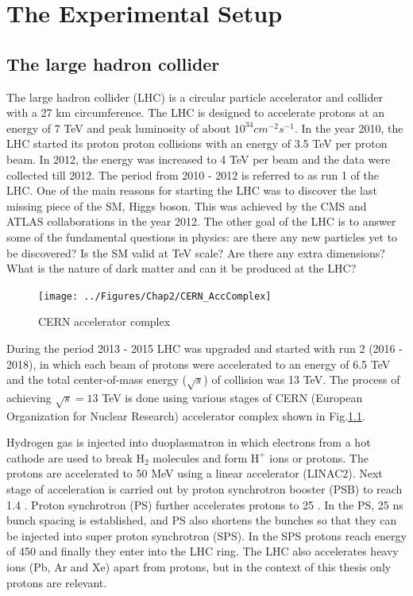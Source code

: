 \chapter{The Experimental Setup}
\label{Chap2}

\section{The large hadron collider}
The large hadron collider (LHC) is a circular particle accelerator and collider with a 27 km circumference. The LHC is designed to 
accelerate protons at an energy of 7 TeV \cite{Bruning:782076} and peak luminosity of about $10^{34}cm^{-2}s^{-1}$.
In the year 2010, the LHC started its proton proton collisions with an energy of 3.5 TeV per proton beam. In 2012, the energy was increased to 4 TeV per beam and the data were collected till 2012. The period from 2010 - 2012 is referred to as run 1 of the LHC.
One of the main reasons for starting the LHC was to discover the last missing piece of the SM, Higgs boson. This was
achieved by the CMS and ATLAS collaborations \cite{Aad:2012tfa}\cite{Chatrchyan:2012xdj} in the year 2012. The other goal of
the LHC is to answer some of the fundamental questions in physics: are there any new particles yet to be discovered?
Is the SM valid at TeV scale? Are there any extra dimensions? What is the nature of dark matter and can it be produced at the LHC?
\begin{figure}[h!]
\centering
\texttt{[image: ../Figures/Chap2/CERN\_AccComplex]}
\caption[CERN accelerator complex]{CERN accelerator complex}
\label{fig:CERN_AccComplex}
\end{figure}
During the period 2013 - 2015 LHC was upgraded and started with run 2 (2016 - 2018), in which each beam of protons were accelerated to 
an energy of 6.5 TeV and the total center-of-mass energy ($\sqrt{s}$) of collision was 13 TeV. The process of achieving $\sqrt{s} = 13$ 
TeV is done using various stages of CERN (European Organization for Nuclear Research) accelerator complex \cite{Haffner:1621894} shown in 
Fig.\ref{fig:CERN_AccComplex}.

Hydrogen gas is injected into duoplasmatron in which electrons from a hot cathode are used to break $\mathrm{H_2}$ molecules and form 
$\mathrm{H^+}$ ions or protons. The protons are accelerated to 50 MeV using a 
linear accelerator (LINAC2). Next stage of acceleration is carried out by proton synchrotron booster (PSB) to reach 1.4 \gev. Proton 
synchrotron (PS) further accelerates protons to 25 \gev. In the PS, 25 ns bunch spacing is established, and PS also shortens the bunches
so that they can be injected into super proton synchrotron (SPS). In the SPS protons reach energy 
of 450 \gev and finally they enter into the LHC ring. The LHC also accelerates heavy ions (Pb, Ar and Xe) apart from protons, but in the 
context of this thesis only protons are relevant.

